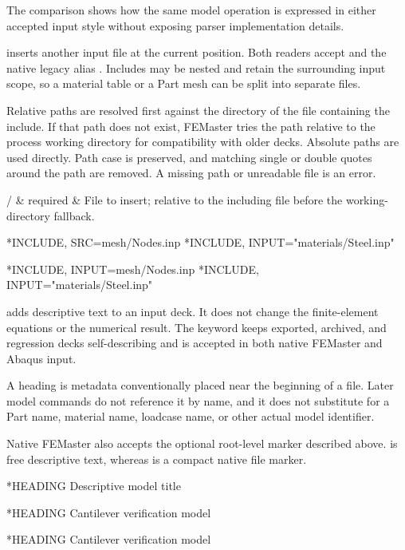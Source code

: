 The comparison shows how the same model operation is expressed in either accepted input style without exposing parser implementation details.


 inserts another input file at the current position. Both readers accept  and the native legacy alias . Includes may be nested and retain the surrounding input scope, so a material table or a Part mesh can be split into separate files.

Relative paths are resolved first against the directory of the file containing the include. If that path does not exist, FEMaster tries the path relative to the process working directory for compatibility with older decks. Absolute paths are used directly. Path case is preserved, and matching single or double quotes around the path are removed. A missing path or unreadable file is an error.

\begin{keywordparameters}
 /  & required & File to insert; relative to the including file before the working-directory fallback. \\
\end{keywordparameters}

\exampleheading
\begin{dialectexamples}
\begin{femasterdeck}
*INCLUDE, SRC=mesh/Nodes.inp
*INCLUDE, INPUT="materials/Steel.inp"
\end{femasterdeck}
\begin{abaqusdeck}
*INCLUDE, INPUT=mesh/Nodes.inp
*INCLUDE, INPUT="materials/Steel.inp"
\end{abaqusdeck}
\end{dialectexamples}


 adds descriptive text to an input deck. It does not change the finite-element equations or the numerical result. The keyword keeps exported, archived, and regression decks self-describing and is accepted in both native FEMaster and Abaqus input.

A heading is metadata conventionally placed near the beginning of a file. Later model commands do not reference it by name, and it does not substitute for a Part name, material name, loadcase name, or other actual model identifier.

Native FEMaster also accepts the optional root-level  marker described above.  is free descriptive text, whereas  is a compact native file marker.

\syntaxheading

\begin{syntax}
*HEADING
Descriptive model title
\end{syntax}

\exampleheading

\begin{dialectexamples}
\begin{femasterdeck}
*HEADING
Cantilever verification model
\end{femasterdeck}
\begin{abaqusdeck}
*HEADING
Cantilever verification model
\end{abaqusdeck}
\end{dialectexamples}

